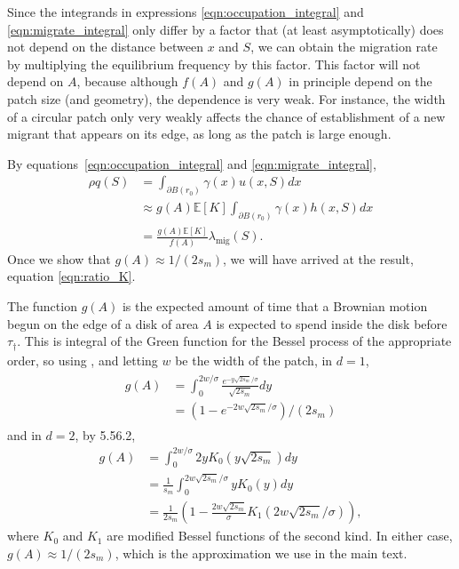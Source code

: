 \documentclass[10pt,letterpaper]{article}
\newcommand{\citet}[1]{\cite{#1}}
\newcommand{\E}{\mathbb{E}}
\newcommand{\one}{\mathbf{1}}
\newcommand{\migrate}{\lambda_\text{mig}}
\begin{document}
Since the integrands in expressions \eqref{eqn:occupation_integral} and \eqref{eqn:migrate_integral} only differ by a factor
that (at least asymptotically) does not depend on the distance between $x$ and $S$,
we can obtain the migration rate by multiplying the equilibrium frequency by this factor.
This factor will not depend on $A$, 
because although $f(A)$ and $g(A)$ in principle depend on the patch size (and geometry),
the dependence is very weak.
For instance, the width of a circular patch only very weakly affects the chance 
of establishment of a new migrant that appears on its edge,
as long as the patch is large enough.

By equations~\eqref{eqn:occupation_integral} and \eqref{eqn:migrate_integral},
\begin{align}
    \rho q(S)  &= \int_{\partial B(r_0)} \gamma(x) u(x,S) dx  \\
          &\approx g(A) \E[K] \int_{\partial B(r_0)} \gamma(x) h(x,S) dx \\
          &= \frac{ g(A) \E[K] }{ f(A) } \migrate(S) . \label{eqn:q_migrate_relation}
\end{align}
Once we show that $g(A) \approx 1/(2 s_m)$, 
we will have arrived at the result, equation \eqref{eqn:ratio_K}.


The function $g(A)$ is the expected amount of time that a Brownian motion begun on the edge of a disk of area $A$
is expected to spend inside the disk before $\tau_\dagger$.
This is integral of the Green function for the Bessel process of the appropriate order, 
so using \citet{borodin2002handbook}, %
and letting $w$ be the width of the patch,
in $d=1$,
\begin{align} \label{eqn:gA_1D}
  \begin{split}
    g(A) %
      &= \int_0^{2w/\sigma} \frac{ e^{- y \sqrt{2s_m}/\sigma }}{\sqrt{2s_m}} dy \\
      &= (1-e^{-2w\sqrt{2s_m}/\sigma})/(2s_m)
  \end{split}
\end{align}
and in $d=2$, by \citet{gradshteyn2007table} 5.56.2,
\begin{align}
    g(A) %
  &= \int_0^{2w/\sigma} 2 y K_0(y \sqrt{2s_m}) dy \\
  &= \frac{1}{s_m}\int_0^{2w\sqrt{2s_m}/\sigma} y K_0(y) dy \\
  &= \frac{1}{2s_m}\left(1- \frac{2w\sqrt{2s_m}}{\sigma} K_1(2w\sqrt{2s_m}/\sigma) \right)  ,
\end{align}
where $K_0$ and $K_1$ are modified Bessel functions of the second kind.
In either case, $g(A) \approx 1/(2s_m)$, which is the approximation we use in the main text.
\end{document}

